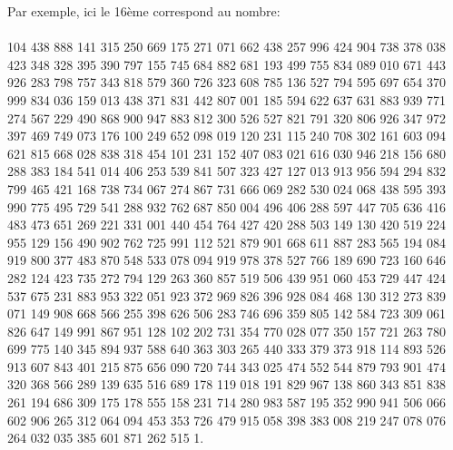 \documentclass{article}
\begin{document}
Par exemple, ici le 16ème correspond au nombre:\\ \\
104 438 888 141 315 250 669 175 271 071 662 438 257 996 424 904 738 378 038 423 348 328 395 390 797 155 745 684 882 681 193 499 755 834 089 010 671 443 926 283 798 757 343 818 579 360 726 323 608 785 136 527 794 595 697 654 370 999 834 036 159 013 438 371 831 442 807 001 185 594 622 637 631 883 939 771 274 567 229 490 868 900 947 883 812 300 526 527 821 791 320 806 926 347 972 397 469 749 073 176 100 249 652 098 019 120 231 115 240 708 302 161 603 094 621 815 668 028 838 318 454 101 231 152 407 083 021 616 030 946 218 156 680 288 383 184 541 014 406 253 539 841 507 323 427 127 013 913 956 594 294 832 799 465 421 168 738 734 067 274 867 731 666 069 282 530 024 068 438 595 393 990 775 495 729 541 288 932 762 687 850 004 496 406 288 597 447 705 636 416 483 473 651 269 221 331 001 440 454 764 427 420 288 503 149 130 420 519 224 955 129 156 490 902 762 725 991 112 521 879 901 668 611 887 283 565 194 084 919 800 377 483 870 548 533 078 094 919 978 378 527 766 189 690 723 160 646 282 124 423 735 272 794 129 263 360 857 519 506 439 951 060 453 729 447 424 537 675 231 883 953 322 051 923 372 969 826 396 928 084 468 130 312 273 839 071 149 908 668 566 255 398 626 506 283 746 696 359 805 142 584 723 309 061 826 647 149 991 867 951 128 102 202 731 354 770 028 077 350 157 721 263 780 699 775 140 345 894 937 588 640 363 303 265 440 333 379 373 918 114 893 526 913 607 843 401 215 875 656 090 720 744 343 025 474 552 544 879 793 901 474 320 368 566 289 139 635 516 689 178 119 018 191 829 967 138 860 343 851 838 261 194 686 309 175 178 555 158 231 714 280 983 587 195 352 990 941 506 066 602 906 265 312 064 094 453 353 726 479 915 058 398 383 008 219 247 078 076 264 032 035 385 601 871 262 515 1.

\newpage

\nocite{*}
\printbibliography
\end{document}
